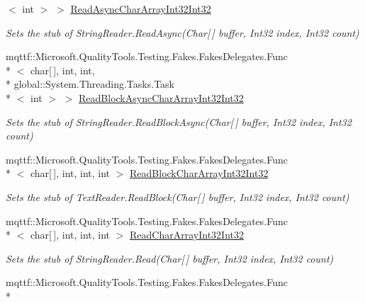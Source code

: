 \begin{DoxyCompactItemize}
$<$ int $>$ $>$ \hyperlink{class_system_1_1_i_o_1_1_fakes_1_1_stub_string_reader_a5f6e3ad0ce7549ad9a4b0ffa0ab36461}{Read\-Async\-Char\-Array\-Int32\-Int32}
\begin{DoxyCompactList}\small\item\em Sets the stub of String\-Reader.\-Read\-Async(\-Char\mbox{[}$\,$\mbox{]} buffer, Int32 index, Int32 count)\end{DoxyCompactList}\item 
mqttf\-::\-Microsoft.\-Quality\-Tools.\-Testing.\-Fakes.\-Fakes\-Delegates.\-Func\\*
$<$ char\mbox{[}$\,$\mbox{]}, int, int, \\*
global\-::\-System.\-Threading.\-Tasks.\-Task\\*
$<$ int $>$ $>$ \hyperlink{class_system_1_1_i_o_1_1_fakes_1_1_stub_string_reader_ab3ec4f381ac0fdb3b1099f7d38d4f727}{Read\-Block\-Async\-Char\-Array\-Int32\-Int32}
\begin{DoxyCompactList}\small\item\em Sets the stub of String\-Reader.\-Read\-Block\-Async(\-Char\mbox{[}$\,$\mbox{]} buffer, Int32 index, Int32 count)\end{DoxyCompactList}\item 
mqttf\-::\-Microsoft.\-Quality\-Tools.\-Testing.\-Fakes.\-Fakes\-Delegates.\-Func\\*
$<$ char\mbox{[}$\,$\mbox{]}, int, int, int $>$ \hyperlink{class_system_1_1_i_o_1_1_fakes_1_1_stub_string_reader_a6b63abe8393141c7d63586d136e1d391}{Read\-Block\-Char\-Array\-Int32\-Int32}
\begin{DoxyCompactList}\small\item\em Sets the stub of Text\-Reader.\-Read\-Block(\-Char\mbox{[}$\,$\mbox{]} buffer, Int32 index, Int32 count)\end{DoxyCompactList}\item 
mqttf\-::\-Microsoft.\-Quality\-Tools.\-Testing.\-Fakes.\-Fakes\-Delegates.\-Func\\*
$<$ char\mbox{[}$\,$\mbox{]}, int, int, int $>$ \hyperlink{class_system_1_1_i_o_1_1_fakes_1_1_stub_string_reader_ac2938d235efdc95cc6291d3b7798e5c7}{Read\-Char\-Array\-Int32\-Int32}
\begin{DoxyCompactList}\small\item\em Sets the stub of String\-Reader.\-Read(\-Char\mbox{[}$\,$\mbox{]} buffer, Int32 index, Int32 count)\end{DoxyCompactList}\item 
mqttf\-::\-Microsoft.\-Quality\-Tools.\-Testing.\-Fakes.\-Fakes\-Delegates.\-Func\\*

\end{DoxyCompactItemize}
